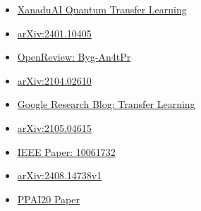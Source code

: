 \documentclass[11pt, conference]{IEEEtran}
\begin{document}
\begin{itemize}
    \item \href{https://github.com/XanaduAI/quantum-transfer-learning}{XanaduAI Quantum Transfer Learning}
    \item \href{https://arxiv.org/pdf/2401.10405}{arXiv:2401.10405}
    \item \href{https://openreview.net/pdf?id=Byg-An4tPr}{OpenReview: Byg-An4tPr}
    \item \href{https://arxiv.org/pdf/2104.02610}{arXiv:2104.02610}
    \item \href{https://research.google/blog/leveraging-transfer-learning-for-large-scale-differentially-private-image-classification/}{Google Research Blog: Transfer Learning}
    \item \href{https://arxiv.org/pdf/2105.04615}{arXiv:2105.04615}
    \item \href{https://ieeexplore.ieee.org/document/10061732}{IEEE Paper: 10061732}
    \item \href{https://arxiv.org/pdf/2408.14738v1}{arXiv:2408.14738v1}
    \item \href{https://www2.isye.gatech.edu/~fferdinando3/cfp/PPAI20/papers/paper_9.pdf}{PPAI20 Paper}
\end{itemize}
\end{document}
